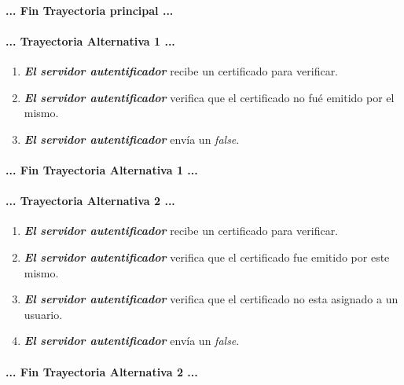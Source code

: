 \documentclass[12pt, a4paper, titlepage]{report}
\begin{document}
		\paragraph{... Fin Trayectoria principal ...}
		
		\paragraph{... Trayectoria Alternativa 1 ...}
		    \begin{enumerate}
		        \item \textbf{\textit{El servidor autentificador}} recibe un certificado para verificar.
		        
		        \item \textbf{\textit{El servidor autentificador}} verifica que el certificado no fué emitido por el mismo.
		        
		        \item \textbf{\textit{El servidor autentificador}} envía un \textit{false}. 
		    \end{enumerate}
		\paragraph{... Fin Trayectoria Alternativa 1 ...}
		
		\paragraph{... Trayectoria Alternativa 2 ...}
		\begin{enumerate}
		
		    \item \textbf{\textit{El servidor autentificador}} recibe un certificado para verificar.
		        
	        \item \textbf{\textit{El servidor autentificador}} verifica que el certificado fue emitido por este mismo.
	        
	        \item \textbf{\textit{El servidor autentificador}} verifica que el certificado no esta asignado a un usuario.
	        
	        \item \textbf{\textit{El servidor autentificador}} envía un \textit{false}. 
	    \end{enumerate}
		\paragraph{... Fin Trayectoria Alternativa 2 ...}
		
\end{document}
